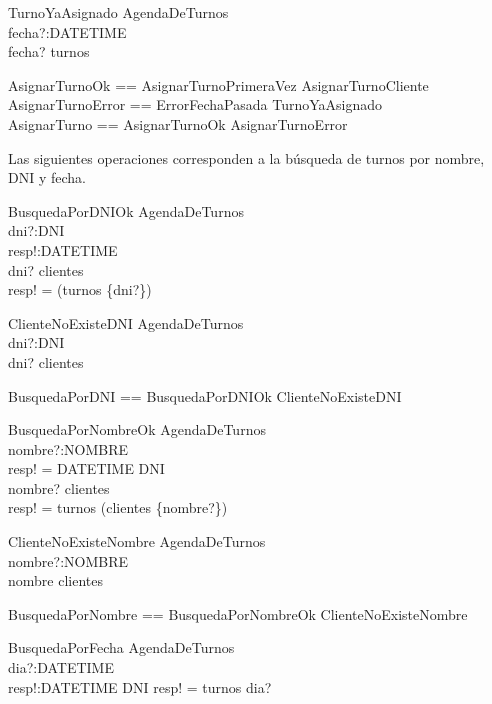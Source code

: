 \documentclass[%
  fleqn,colorlinks,linkcolor=blue,citecolor=blue,urlcolor=blue]{eptcs}
\DeclareMathOperator{\Ima}{Im}
\begin{document}
  \begin{schema}{TurnoYaAsignado}
  \Xi AgendaDeTurnos \\
  fecha?:DATETIME \\
  \where
  fecha? \in turnos
  \end{schema}

  \begin{zed}
  AsignarTurnoOk  == AsignarTurnoPrimeraVez \lor AsignarTurnoCliente \\
  AsignarTurnoError == ErrorFechaPasada \lor TurnoYaAsignado \\
  AsignarTurno == AsignarTurnoOk \lor AsignarTurnoError
  \end{zed}

  Las siguientes operaciones corresponden a la b\'usqueda de turnos por nombre, DNI y fecha.

  \begin{schema}{BusquedaPorDNIOk}
  \Xi AgendaDeTurnos \\
  dni?:DNI \\
  resp!:DATETIME \\
  \where
  dni? \in \dom clientes \\
  resp! = \dom(turnos \dres \{dni?\})
  \end{schema}

  \begin{schema}{ClienteNoExisteDNI}
  \Xi AgendaDeTurnos \\
  dni?:DNI \\
  \where
  dni? \notin \dom clientes
  \end{schema}

  \begin{zed}
  BusquedaPorDNI == BusquedaPorDNIOk \lor ClienteNoExisteDNI
  \end{zed}

  \begin{schema}{BusquedaPorNombreOk}
  \Xi AgendaDeTurnos \\
  nombre?:NOMBRE \\
  resp! = DATETIME \pfun DNI \\
  \where
  nombre? \in \Ima clientes \\
  resp! = turnos \dres \dom (clientes \dres \{nombre?\})
  \end{schema}

  \begin{schema}{ClienteNoExisteNombre}
  \Xi AgendaDeTurnos \\
  nombre?:NOMBRE \\
  \where
  nombre \notin \Ima clientes
  \end{schema}

  \begin{zed}
  BusquedaPorNombre == BusquedaPorNombreOk \lor ClienteNoExisteNombre
  \end{zed}

  \begin{schema}{BusquedaPorFecha}
  \Xi AgendaDeTurnos \\
  dia?:\power DATETIME \\
  resp!:DATETIME \pfun DNI
  \where
  resp! = turnos \rres dia?
  \end{schema}
\end{document}
